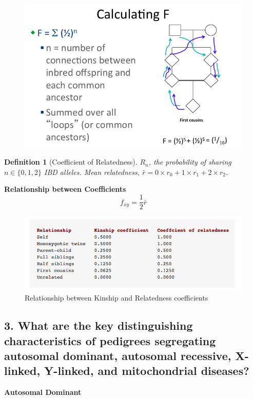 \documentclass{tufte-handout}
\theoremstyle{noparens}
\newtheorem*{define}{Definition}
\begin{document}
\begin{figure}
\includegraphics[scale=0.5]{./figs/kincoeff}
\end{figure}

\begin{define}[Coefficient of Relatedness]
$R_n$, the probability of sharing $n \in \{0,1,2\}$ IBD alleles. Mean relatedness, $\bar{r} = 0 \times r_0 + 1 \times r_1 + 2 \times r_2$.
\end{define}

\noindent
\textbf{Relationship between Coefficients}
\[f_{xy} = \frac{1}{2}\bar{r}\]
\begin{figure}[h!]
\includegraphics[scale=0.5]{./figs/kinrelate}
\caption{Relationship between Kinship and Relatedness coefficients}
\end{figure}


\newpage
\subsection{3.
What are the key distinguishing characteristics of pedigrees segregating autosomal dominant, autosomal recessive, X-linked, Y-linked, and mitochondrial diseases?}
\label{subsec:03}

 \noindent
 \textbf{Autosomal Dominant}
 
\end{document}
